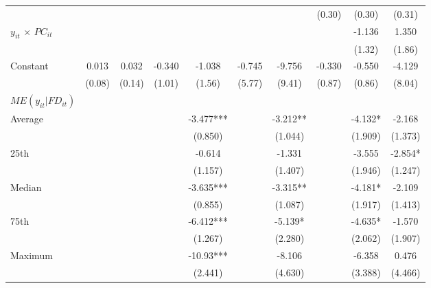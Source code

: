 \documentclass[12pt, a4paper]{article}
\begin{document}
\begin{table}
\begin{threeparttable}
{\begin{tabular}{l*{9}{c}}
				&                     &                     &                     &                     &                     &                     &      (0.30)         &      (0.30)         &      (0.31)         \\
				$y_{it}$ $\times$ $PC_{it}$  &                     &                     &                     &                     &                     &                     &                     &      -1.136         &       1.350         \\
				&                     &                     &                     &                     &                     &                     &                     &      (1.32)         &      (1.86)         \\
				Constant            &       0.013         &       0.032         &      -0.340         &      -1.038         &      -0.745         &      -9.756         &      -0.330         &      -0.550         &      -4.129         \\
				&      (0.08)         &      (0.14)         &      (1.01)         &      (1.56)         &      (5.77)         &      (9.41)         &      (0.87)         &      (0.86)         &      (8.04)         \\
				\hline
				$ME(y_{it}|FD_{it})$ \\
				Average&&&&	-3.477***	&&	-3.212** &&		-4.132*	 &	-2.168\\
				&&&&(0.850)   &&		(1.044)   	&&	(1.909)	 &	(1.373)\\
				
				25th&&&&	-0.614   &&		-1.331   &&		-3.555	& 	-2.854*\\
				&&&&(1.157)   &&		(1.407)   	&&	(1.946)	 &	(1.247)\\
				
				Median&&&&	-3.635***	&&	-3.315** &&	-4.181*	 &	-2.109\\
				&&&&(0.855)  && 		(1.087)   	&&	(1.917)	 &	(1.413)\\
				
				75th&&&&	-6.412***	&&	-5.139*  	&&	-4.635*	 &	-1.570\\
				&&&&(1.267)   &&		(2.280)   	&&	(2.062)	 &	(1.907)\\
				
				Maximum&&&&	-10.93***	&&	-8.106   	&&	-6.358	& 	0.476\\
				&&&&(2.441)   	&&	(4.630)   	&&	(3.388)	 &	(4.466)\\
				
				
				

\end{tabular}}
\end{threeparttable}
\end{table}
\end{document}

